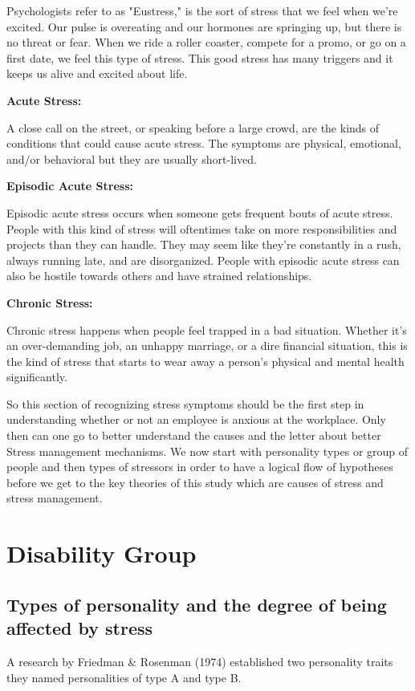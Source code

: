 Psychologists refer to as "Eustress," is the sort of stress that we feel when we're excited. Our pulse is overeating and our hormones are springing up, but there is no threat or fear. When we ride a roller coaster, compete for a promo, or go on a first date, we feel this type of stress. This good stress has many triggers and it keeps us alive and excited about life.

\textbf{Acute Stress: }

A close call on the street, or speaking before a large crowd, are the kinds of conditions that could cause acute stress. The symptoms are physical, emotional, and/or behavioral but they are usually short-lived.

\textbf{Episodic Acute Stress: }

Episodic acute stress occurs when someone gets frequent bouts of acute stress. People with this kind of stress will oftentimes take on more responsibilities and projects than they can handle. They may seem like they’re constantly in a rush, always running late, and are disorganized. People with episodic acute stress can also be hostile towards others and have strained relationships.

\textbf{Chronic Stress: }

Chronic stress happens when people feel trapped in a bad situation. Whether it's an over-demanding job, an unhappy marriage, or a dire financial situation, this is the kind of stress that starts to wear away a person's physical and mental health significantly.\citep{Cottini2013MentalEurope}

So this section of recognizing stress symptoms should be the first step in understanding whether or not an employee is anxious at the workplace.  Only then can one go to better understand the causes and the letter about better Stress management mechanisms. We now start with personality types or group of people and then types of stressors in order to have a logical flow of hypotheses before we get to the key theories of this study which are causes of stress and stress management.

\section{Disability Group}

\subsection{Types of personality and the degree of being affected by stress} 
A research by Friedman \& Rosenman (1974) established two personality traits they named personalities of type A and type B.  

